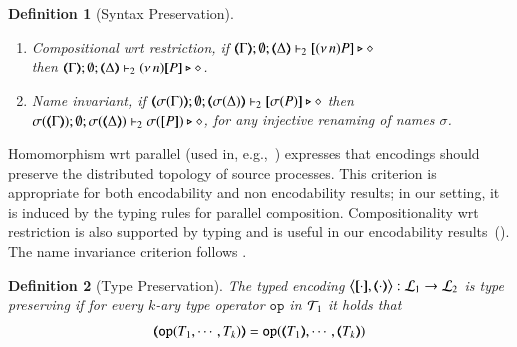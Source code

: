 \documentclass[preprint,11pt]{elsarticle}
\newtheorem{definition}{Definition}[section]
\begin{document}
{{\begin{definition}[Syntax Preservation]
\begin{enumerate}[1.]
		\item	\emph{Compositional wrt restriction},  if 
		$\mapt{\Gamma}; \emptyset; \mapt{\Delta} \proves_2 \map{\news{n}P} \hastype \Proc$ \\
		then 
		$\mapt{\Gamma}; \emptyset; \mapt{\Delta} \proves_2 \news{n}\map{P} \hastype \Proc$.
		
		\item \emph{Name invariant},   if
		$\mapt{\sigma(\Gamma)}; \emptyset; \mapt{\sigma(\Delta)} \proves_2 \map{\sigma(P)} \hastype \Proc$
		then \\
		$\sigma(\mapt{\Gamma}); \emptyset; \sigma(\mapt{\Delta}) \proves_2 \sigma(\map{P}) \hastype \Proc$, 
		for any injective renaming  of names $\sigma$.
	\end{enumerate}
\end{definition}


Homomorphism wrt parallel (used in, e.g.,~\cite{Palamidessi03,DBLP:conf/lics/PalamidessiSVV06})
expresses that encodings should preserve the distributed topology of source processes. This criterion
 is appropriate for both encodability and non encodability results; in our setting, it is
induced by the typing rules for parallel composition.
Compositionality wrt restriction 
is also supported by typing and is 
useful in our encodability results~().
The name invariance criterion follows \cite{DBLP:journals/iandc/Gorla10,DBLP:conf/icalp/LanesePSS10}. 


\begin{definition}[Type Preservation]
	\label{def:tp}
	The typed encoding 
	$\enco{\map{\cdot}, \mapt{\cdot}}: \tyl{L}_1 \to \tyl{L}_2$ is \emph{type preserving}
	if for every $k$-ary type operator $\mathtt{op}$ in ${\cal{T}}_1$ it holds that 
	 $$\mapt{\mathtt{op}(T_1, \cdots, T_k)} = \mathtt{op}(\mapt{T_1}, \cdots, \mapt{T_k})$$
	\end{definition}


}}
\end{document}
